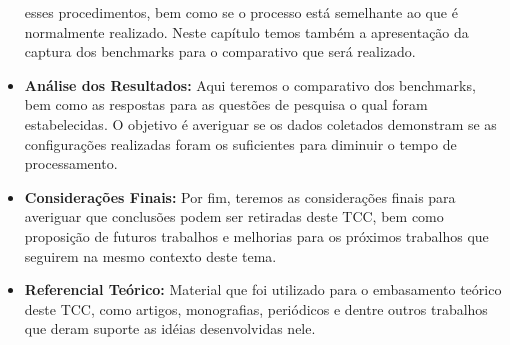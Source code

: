 \begin{itemize}
                                                                            esses procedimentos, bem como se o processo está semelhante ao que é
                                                                            normalmente realizado. Neste capítulo temos também a apresentação da
                                                                            captura dos benchmarks para o comparativo que será realizado.
        \item \textbf{Análise dos Resultados:} Aqui teremos o comparativo dos benchmarks, bem como as respostas para as
                                                                  questões de pesquisa o qual foram estabelecidas. O objetivo é averiguar se os
                                                                  dados coletados demonstram se as configurações realizadas foram os suficientes
                                                                  para diminuir o tempo de processamento.
        \item \textbf{Considerações Finais:} Por fim, teremos as considerações finais para averiguar que conclusões podem ser
                                                                     retiradas deste TCC, bem como proposição de futuros trabalhos e melhorias para os
                                                                     próximos trabalhos que seguirem na mesmo contexto deste tema.
        \item \textbf{Referencial Teórico:} Material que foi utilizado para o embasamento teórico deste TCC, como artigos,
                                                                  monografias, periódicos e dentre outros trabalhos que deram suporte as idéias
                                                                  desenvolvidas nele.
    \end{itemize}